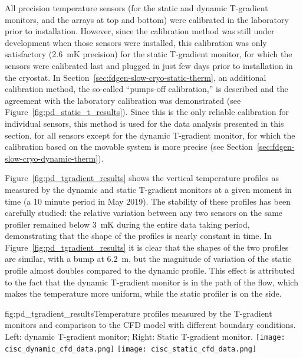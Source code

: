 All precision temperature sensors (for the static and dynamic T-gradient monitors,  and the \twod arrays at top and bottom) were calibrated in the laboratory prior to installation. However, since the calibration method was still under development when those sensors 
were installed, this calibration was only satisfactory (\SI{2.6}{mK} precision) for the static T-gradient monitor, for which the sensors were calibrated last and  plugged in just few days prior to installation in the cryostat. 
In Section~\ref{sec:fdgen-slow-cryo-static-therm}, an additional calibration method, the so-called ``pumps-off calibration,'' is described and the agreement with the laboratory calibration was demonstrated %
(see Figure~\ref{fig:pd_static_t_results}). Since this is the only reliable calibration for individual sensors, this method is used for the data analysis presented in this section, for all sensors except for the dynamic T-gradient monitor, for which the calibration based on the movable system is more precise (see Section~\ref{sec:fdgen-slow-cryo-dynamic-therm}). 

Figure~\ref{fig:pd_tgradient_results} shows the vertical temperature profiles as measured by the dynamic and static T-gradient monitors at a given moment in time (a 10 minute period in May 2019). The stability of these profiles has been carefully studied: the relative variation between any two sensors on the same profiler remained below \SI{3}{mK} during the entire data taking period, demonstrating that the shape of the profiles is nearly constant in time. In Figure~\ref{fig:pd_tgradient_results} it is clear  %
that the shapes of the two profiles are similar, with a bump at \SI{6.2}{m}, but the magnitude of %
variation of the static profile almost doubles %
compared to the dynamic profile. This effect is attributed to the fact that the dynamic T-gradient monitor is in the path of the \lar flow, which makes the temperature more uniform, while the static profiler is on the side.  

\begin{dunefigure}{fig:pd_tgradient_results}{Temperature profiles measured by the T-gradient monitors and comparison to the CFD model with different boundary conditions. Left: dynamic T-gradient monitor; Right: Static T-gradient monitor.}
  \texttt{[image: cisc\_dynamic\_cfd\_data.png]}%
  \texttt{[image: cisc\_static\_cfd\_data.png]}%
\end{dunefigure}

